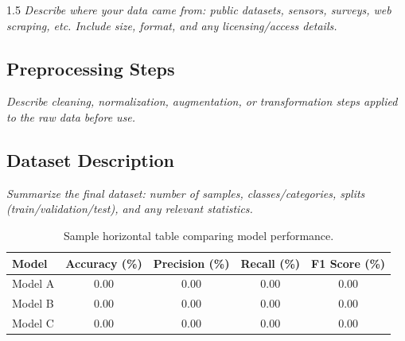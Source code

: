 \begin{spacing}{1.5}
\textit{Describe where your data came from: public datasets, sensors, surveys, web scraping, etc. Include size, format, and any licensing/access details.}

\subsection{Preprocessing Steps}

\textit{Describe cleaning, normalization, augmentation, or transformation steps applied to the raw data before use.}

\subsection{Dataset Description}

\textit{Summarize the final dataset: number of samples, classes/categories, splits (train/validation/test), and any relevant statistics.}

\begin{table}[h]
\centering
\captionsetup{font=small}
\caption{Sample horizontal table comparing model performance.}
\label{tab:sample_horizontal}
\begin{tabular}{@{}lcccc@{}}
\toprule
\textbf{Model} & \textbf{Accuracy (\%)} & \textbf{Precision (\%)} & \textbf{Recall (\%)} & \textbf{F1 Score (\%)} \\
\midrule
Model A & 0.00 & 0.00 & 0.00 & 0.00 \\
Model B & 0.00 & 0.00 & 0.00 & 0.00 \\
Model C & 0.00 & 0.00 & 0.00 & 0.00 \\
\bottomrule
\end{tabular}
\end{table}


\end{spacing}
